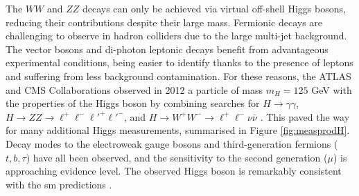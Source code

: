 The $WW$ and $ZZ$ decays can only be achieved via virtual off-shell Higgs bosons, reducing their contributions despite their large mass. Fermionic decays are challenging to observe in hadron colliders due to the large multi-jet background. The vector bosons and di-photon leptonic decays benefit from advantageous experimental conditions, being easier to identify thanks to the presence of leptons and suffering from less background contamination. For these reasons, the ATLAS and CMS Collaborations observed in 2012 a particle of mass $m_H = 125$ GeV with the properties of the Higgs boson by combining searches for $H \rightarrow \gamma\gamma$, $H \rightarrow ZZ \rightarrow \ell^+\ell^-\ell'^+\ell'^-$, and $H \rightarrow W^+W^- \rightarrow \ell^+\ell^-\nu \bar{\nu}$ \cite{ATLAS:2012yve, CMS:2012qbp}. This paved the way for many additional Higgs measurements, summarised in Figure \ref{fig:measprodH}. Decay modes to the electroweak gauge bosons and third-generation fermions ($t, b, \tau$) have all been observed, and the sensitivity to the second generation ($\mu$) is approaching evidence level. The observed Higgs boson is remarkably consistent with the \gls{sm} predictions \cite{ATLAS:2022vkf}. 